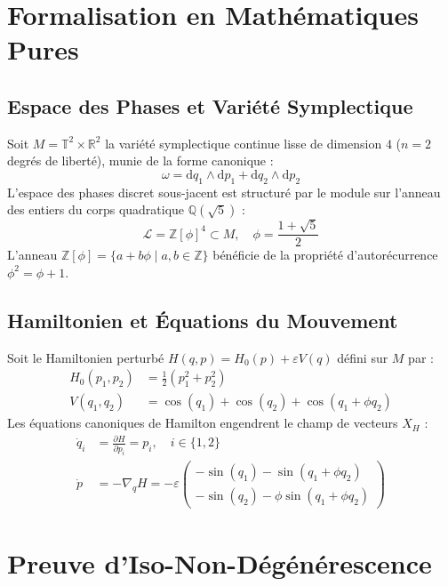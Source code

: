 \documentclass[10pt,twocolumn,a4paper]{article}
\begin{document}
\section{Formalisation en Mathématiques Pures}

\subsection{Espace des Phases et Variété Symplectique}
Soit $M = \mathbb{T}^2 \times \mathbb{R}^2$ la variété symplectique continue lisse de dimension $4$ ($n=2$ degrés de liberté), munie de la forme canonique :
\begin{equation}
\omega = \mathrm{d}q_1 \wedge \mathrm{d}p_1 + \mathrm{d}q_2 \wedge \mathrm{d}p_2
\end{equation}
L'espace des phases discret sous-jacent est structuré par le module sur l'anneau des entiers du corps quadratique $\mathbb{Q}(\sqrt{5})$ :
\begin{equation}
\mathcal{L} = \mathbb{Z}[\phi]^4 \subset M, \quad \phi = \frac{1+\sqrt{5}}{2}
\end{equation}
L'anneau $\mathbb{Z}[\phi] = \{a + b\phi \mid a, b \in \mathbb{Z}\}$ bénéficie de la propriété d'autorécurrence $\phi^2 = \phi + 1$.

\subsection{Hamiltonien et Équations du Mouvement}
Soit le Hamiltonien perturbé $H(q, p) = H_0(p) + \varepsilon V(q)$ défini sur $M$ par :
\begin{align}
H_0(p_1, p_2) &= \frac{1}{2}\left(p_1^2 + p_2^2\right) \label{eq:H0}\\
V(q_1, q_2) &= \cos(q_1) + \cos(q_2) + \cos(q_1 + \phi q_2) \label{eq:V}
\end{align}
Les équations canoniques de Hamilton engendrent le champ de vecteurs $X_H$ :
\begin{align}
\dot{q}_i &= \frac{\partial H}{\partial p_i} = p_i, \quad i \in \{1, 2\} \\
\dot{p} &= -\nabla_q H = -\varepsilon \begin{pmatrix} 
-\sin(q_1) - \sin(q_1 + \phi q_2) \\ 
-\sin(q_2) - \phi \sin(q_1 + \phi q_2) 
\end{pmatrix}
\end{align}

\section{Preuve d'Iso-Non-Dégénérescence}
\end{document}
